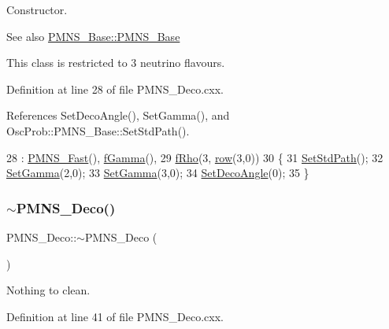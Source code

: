 Constructor. \begin{DoxySeeAlso}{See also}
\hyperlink{classOscProb_1_1PMNS__Base_aa53e83b03a9cf4bdfa0a07136bd17a79}{P\+M\+N\+S\+\_\+\+Base\+::\+P\+M\+N\+S\+\_\+\+Base}
\end{DoxySeeAlso}
This class is restricted to 3 neutrino flavours. 

Definition at line 28 of file P\+M\+N\+S\+\_\+\+Deco.\+cxx.



References Set\+Deco\+Angle(), Set\+Gamma(), and Osc\+Prob\+::\+P\+M\+N\+S\+\_\+\+Base\+::\+Set\+Std\+Path().


\begin{DoxyCode}
28                      : \hyperlink{classOscProb_1_1PMNS__Fast_a2bbac744bf63753105d766a860af7c0d}{PMNS\_Fast}(), \hyperlink{classOscProb_1_1PMNS__Deco_ae2f30ac9f8b25344959f1698616d337a}{fGamma}(),
29 \hyperlink{classOscProb_1_1PMNS__Deco_a0488d62b4ef4cf5b43425769f5fcdbdf}{fRho}(3, \hyperlink{classOscProb_1_1PMNS__Deco_a34634741bc68bc1c524cf47f44e7f5b6}{row}(3,0))
30 \{
31   \hyperlink{classOscProb_1_1PMNS__Base_add6533a9fc9acdfc7ae258b62570d78d}{SetStdPath}();
32   \hyperlink{classOscProb_1_1PMNS__Deco_ac06a9c503d1c5b4a43c4eb797881898d}{SetGamma}(2,0);
33   \hyperlink{classOscProb_1_1PMNS__Deco_ac06a9c503d1c5b4a43c4eb797881898d}{SetGamma}(3,0);
34   \hyperlink{classOscProb_1_1PMNS__Deco_a35e79054682aa88c55f4350c29336014}{SetDecoAngle}(0);
35 \}
\end{DoxyCode}
\mbox{\label{classOscProb_1_1PMNS__Deco_a5539610ab44c510c204ae884fb8e2a0e}} 
\subsubsection{\texorpdfstring{$\sim$\+P\+M\+N\+S\+\_\+\+Deco()}{~PMNS\_Deco()}}
{\footnotesize\ttfamily P\+M\+N\+S\+\_\+\+Deco\+::$\sim$\+P\+M\+N\+S\+\_\+\+Deco (\begin{DoxyParamCaption}{ }\end{DoxyParamCaption})\hspace{0.3cm}{\ttfamily [virtual]}}

Nothing to clean. 

Definition at line 41 of file P\+M\+N\+S\+\_\+\+Deco.\+cxx.


